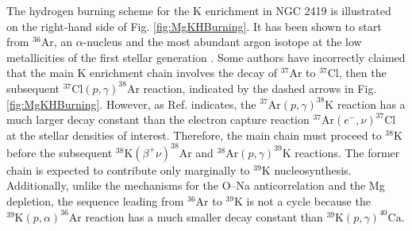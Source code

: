 The hydrogen burning scheme for the K enrichment in NGC 2419 is illustrated on the right-hand side of Fig. \ref{fig:MgKHBurning}. It has been shown to start from $^{36}$Ar, an $\alpha$-nucleus and the most abundant argon isotope at the low metallicities of the first stellar generation \cite{Ventura2012}. Some authors \cite{Ventura2012,Mucciarelli2015} have incorrectly claimed that the main K enrichment chain involves the decay of $^{37}$Ar to $^{37}$Cl, then the subsequent $^{37}\mathrm{Cl}(p,\gamma)^{38}\mathrm{Ar}$ reaction, indicated by the dashed arrows in Fig. \ref{fig:MgKHBurning}. However, as Ref. \cite{Iliadis2016} indicates, the $^{37}\mathrm{Ar}(p,\gamma)^{38}\mathrm{K}$ reaction has a much larger decay constant than the electron capture reaction $^{37}\mathrm{Ar}(e^{-}, \nu)^{37}\mathrm{Cl}$ at the stellar densities of interest. Therefore, the main chain must proceed to $^{38}$K before the subsequent $^{38}\mathrm{K}(\beta^{+}\nu)^{38}\mathrm{Ar}$ and $^{38}\mathrm{Ar}(p,\gamma)^{39}\mathrm{K}$ reactions. The former chain is expected to contribute only marginally to $^{39}$K nucleosynthesis. Additionally, unlike the mechanisms for the O--Na anticorrelation and the Mg depletion, the sequence leading from $^{36}$Ar to $^{39}$K is not a cycle because the $^{39}\mathrm{K}(p,\alpha)^{36}\mathrm{Ar}$ reaction has a much smaller decay constant than $^{39}\mathrm{K}(p,\gamma)^{40}\mathrm{Ca}$.

